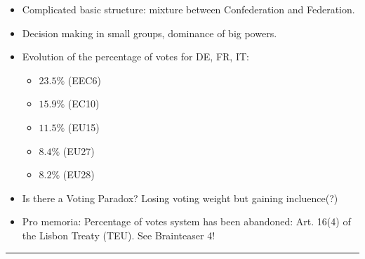 \begin{itemize}
    \item Complicated basic structure: mixture between Confederation and Federation.
    \item Decision making in small groups, dominance of big powers.
    \item Evolution of the percentage of votes for DE, FR, IT:
        \begin{itemize}
            \item $23.5\%$ (EEC6)
            \item $15.9\%$ (EC10)
            \item $11.5\%$ (EU15)
            \item $8.4\%$ (EU27)
            \item $8.2\%$ (EU28)
        \end{itemize}
    \item Is there a Voting Paradox? Losing voting weight but gaining incluence(?)
    \item Pro memoria: Percentage of votes system has been abandoned: Art. 16(4)
    of the Lisbon Treaty (TEU). See Brainteaser 4!
\end{itemize}

\hrule

\vspace{1\baselineskip}


